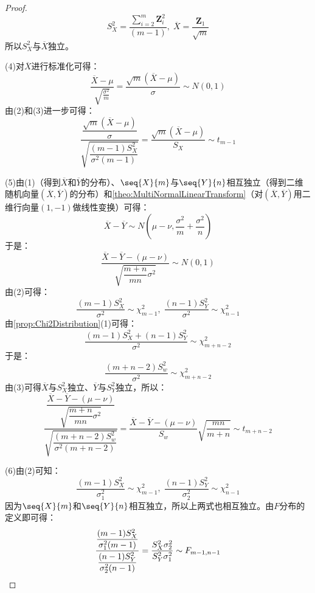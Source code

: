\begin{proof}
	\begin{equation*}
		S_X^2=\frac{\sum\limits_{i=2}^{m}\mathbf{Z}_i^2}{(m-1)},\;\overline{X}=\frac{\mathbf{Z}_1}{\sqrt{m}}
	\end{equation*}
	所以$S_X^2$与$\overline{X}$独立。\par
	(4)对$\overline{X}$进行标准化可得：
	\begin{equation*}
		\frac{\overline{X}-\mu}{\sqrt{\frac{\sigma^2}{m}}}=\frac{\sqrt{m}(\overline{X}-\mu)}{\sigma}\sim N(0,1)
	\end{equation*}
	由(2)和(3)进一步可得：
	\begin{equation*}
		\frac{\dfrac{\sqrt{m}(\overline{X}-\mu)}{\sigma}}{\sqrt{\dfrac{(m-1)S_X^2}{\sigma^2(m-1)}}}=\frac{\sqrt{m}(\overline{X}-\mu)}{S_X}\sim t_{m-1}
	\end{equation*}\par
	(5)由(1)（得到$\overline{X}$和$\overline{Y}$的分布）、$\seq{X}{m}$与$\seq{Y}{n}$相互独立（得到二维随机向量$(\overline{X},\overline{Y})$的分布）和\cref{theo:MultiNormalLinearTransform}（对$(\overline{X},\overline{Y})$用二维行向量$(1,-1)$做线性变换）可得：
	\begin{equation*}
		\overline{X}-\overline{Y}\sim N\left(\mu-\nu,\frac{\sigma^2}{m}+\frac{\sigma^2}{n}\right)
	\end{equation*}
	于是：
	\begin{equation*}
		\frac{\overline{X}-\overline{Y}-(\mu-\nu)}{\sqrt{\dfrac{m+n}{mn}\sigma^2}}\sim N(0,1)
	\end{equation*}
	由(2)可得：
	\begin{equation*}
		\frac{(m-1)S_X^2}{\sigma^2}\sim\chi_{m-1}^2,\;
		\frac{(n-1)S_Y^2}{\sigma^2}\sim\chi_{n-1}^2
	\end{equation*}
	由\cref{prop:Chi2Distribution}(1)可得：
	\begin{equation*}
		\frac{(m-1)S_X^2+(n-1)S_Y^2}{\sigma^2}\sim\chi_{m+n-2}^2
	\end{equation*}
	于是：
	\begin{equation*}
		\frac{(m+n-2)S_w^2}{\sigma^2}\sim\chi_{m+n-2}^2
	\end{equation*}
	由(3)可得$\overline{X}$与$S_X^2$独立、$\overline{Y}$与$S_Y^2$独立，所以：
	\begin{equation*}
		\frac{\dfrac{\overline{X}-\overline{Y}-(\mu-\nu)}{\sqrt{\dfrac{m+n}{mn}\sigma^2}}}{\sqrt{\dfrac{(m+n-2)S_w^2}{\sigma^2(m+n-2)}}}=\frac{\overline{X}-\overline{Y}-(\mu-\nu)}{S_w}\sqrt{\dfrac{mn}{m+n}}\sim t_{m+n-2}
	\end{equation*}\par
	(6)由(2)可知：
	\begin{equation*}
		\frac{(m-1)S_X^2}{\sigma_1^2}\sim\chi_{m-1}^2,\;
		\frac{(n-1)S_Y^2}{\sigma_2^2}\sim\chi_{n-1}^2
	\end{equation*}
	因为$\seq{X}{m}$和$\seq{Y}{n}$相互独立，所以上两式也相互独立。由$F$分布的定义即可得：
	\begin{equation*}
		\frac{\dfrac{(m-1)S_X^2}{\sigma_1^2(m-1)}}{\dfrac{(n-1)S_Y^2}{\sigma_2^2(n-1)}}=\frac{S_X^2\sigma_2^2}{S_Y^2\sigma_1^2}\sim F_{m-1,n-1}\qedhere
	\end{equation*}
\end{proof}